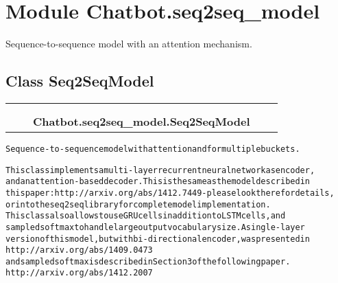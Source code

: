 %
%
%


\section{Module Chatbot.seq2seq\_model}

    \label{Chatbot:seq2seq_model}
Sequence-to-sequence model with an attention mechanism.



\subsection{Class Seq2SeqModel}

    \label{Chatbot:seq2seq_model:Seq2SeqModel}
\begin{tabular}{cccccc}
\multicolumn{2}{r}{\settowidth{\BCL}{object}\multirow{2}{\BCL}{object}}
&&
  \\\cline{3-3}
  &&\multicolumn{1}{c|}{}
&&
  \\
&&\multicolumn{2}{l}{\textbf{Chatbot.seq2seq\_model.Seq2SeqModel}}
\end{tabular}

\begin{alltt}
Sequence-to-sequence model with attention and for multiple buckets.

This class implements a multi-layer recurrent neural network as encoder,
and an attention-based decoder. This is the same as the model described in
this paper: http://arxiv.org/abs/1412.7449 - please look there for details,
or into the seq2seq library for complete model implementation.
This class also allows to use GRU cells in addition to LSTM cells, and
sampled softmax to handle large output vocabulary size. A single-layer
version of this model, but with bi-directional encoder, was presented in
  http://arxiv.org/abs/1409.0473
and sampled softmax is described in Section 3 of the following paper.
  http://arxiv.org/abs/1412.2007
\end{alltt}


